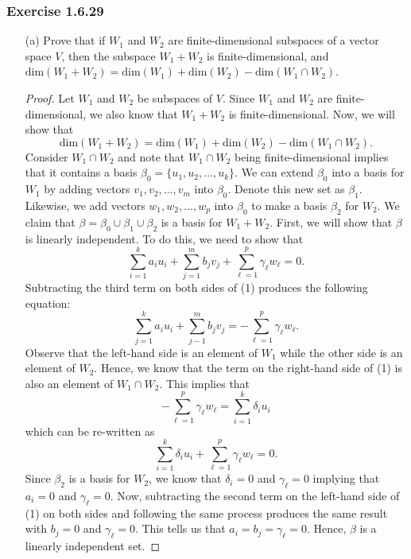\subsubsection{Exercise 1.6.29} 
\begin{enumerate}
    \item[(a)] Prove that if \( W_{1}  \) and \( W_{2}  \) are finite-dimensional subspaces of a vector space \( V  \), then the subspace \( W_{1} + W_{2} \) is finite-dimensional, and \( \text{dim}(W_{1} + W_{2}) = \text{dim}(W_{1}) + \text{dim}(W_{2}) - \text{dim}(W_{1} \cap W_{2}) \).
        \begin{proof}
        Let \( W_{1} \) and \( W_{2} \) be subspaces of \( V \). Since \( W_{1}  \) and \( W_{2} \) are finite-dimensional, we also know that \( W_{1} + W_{2}  \) is finite-dimensional. Now, we will show that  
        \[  \text{dim}(W_{1} + W_{2}) = \text{dim}(W_{1}) +  \text{dim}(W_{2}) - \text{dim}(W_{1} \cap W_{2}). \]
        Consider \( W_{1} \cap W_{2} \) and note that \( W_{1} \cap W_{2} \) being finite-dimensional implies that it contains a basis \( \beta_{0} = \{ u_{1}, u_{2}, \dots, u_{k }  \}  \). We can extend \( \beta_{0} \) into a basis for \( W_{1} \) by adding vectors \( v_{1}, v_{2}, \dots, v_{m}  \) into \( \beta_{0} \). Denote this new set as \( \beta_{1} \). Likewise, we add vectors \( w_{1}, w_{2}, \dots, w_{p}   \) into \( \beta_{0}  \) to make a basis \( \beta_{2} \) for \( W_{2} \). We claim that \( \beta = \beta_{0} \cup \beta_{1} \cup \beta_{2} \) is a basis for \( W_{1} + W_{2} \). First, we will show that \( \beta \) is linearly independent. To do this, we need to show that 
        \[  \sum_{ i=1 }^{ k  } a_{i} u_{i} + \sum_{ j=1 }^{ m } b_{j} v_{j} + \sum_{ \ell = 1  }^{ p  } \gamma_{\ell} w_{\ell} = 0. \tag{1} \]
        Subtracting the third term on both sides of (1) produces the following equation:
        \[ \sum_{ j=1 }^{ k  } a_{i} u_{i} + \sum_{ j-1 }^{ m } b_{j} v_{j} = - \sum_{ \ell =1  }^{ p } \gamma_{\ell} w_{\ell}. \]
        Observe that the left-hand side is an element of \( W_{1} \) while the other side is an element of \( W_{2} \). Hence, we know that the term on the right-hand side of (1) is also an element of \( W_{1} \cap W_{2} \). This implies that 
        \[  - \sum_{ \ell = 1  }^{ p } \gamma_{\ell} w_{\ell} = \sum_{ i=1 }^{ k  } \delta_{i} u_{i} \]
        which can be re-written as 
        \[  \sum_{ i=1 }^{ k  } \delta_{i} u_{i} + \sum_{ \ell = 1  }^{ p } \gamma_{\ell} w_{\ell} = 0. \]
        Since \( \beta_{2} \) is a basis for \( W_{2} \), we know that \( \delta_{i} = 0  \) and \( \gamma_{\ell } = 0  \) implying that \( a_{i} = 0  \) and \( \gamma_{\ell} = 0  \). Now, subtracting the second term on the left-hand side of (1) on both sides and following the same process produces the same result with \( b_{j} = 0  \) and \( \gamma_{\ell} = 0  \). This tells us that \( a_{i} = b_{j} = \gamma_{\ell} = 0  \). Hence, \( \beta \) is a linearly independent set. 


\end{proof}
\end{enumerate}
